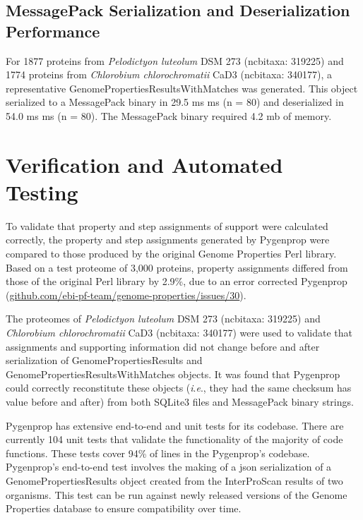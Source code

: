 \subsection{MessagePack Serialization and Deserialization Performance} 
\label{messagepack-performance}

For 1877 proteins from \textit{Pelodictyon luteolum} DSM 273 (\gls{ncbitaxa}:  
319225) and 1774 proteins from \textit{Chlorobium chlorochromatii} CaD3 
(\gls{ncbitaxa}: 340177), a representative GenomePropertiesResultsWithMatches 
was generated. This object serialized to a MessagePack binary in 29.5 ms  ms (\gls{n} = 80) and deserialized in 54.0 ms  ms (\gls{n} = 80). 
The MessagePack binary required 4.2 \gls{mb} of memory.

\section{Verification and Automated Testing}

To validate that property and step assignments of support were calculated 
correctly, the property and step assignments generated by Pygenprop were 
compared to those produced by the original Genome Properties Perl library. Based 
on a test proteome of 3,000 proteins, property assignments differed from those 
of the original Perl library by 2.9\%, due to an error corrected Pygenprop 
(\href{http://github.com/ebi-pf-team/genome-properties/issues/30}{github.com/ebi-pf-team/genome-properties/issues/30}).

The proteomes of \textit{Pelodictyon luteolum} DSM 273 (\gls{ncbitaxa}:  319225) 
and \textit{Chlorobium chlorochromatii} CaD3 (\gls{ncbitaxa}: 340177) were used 
to validate that assignments and supporting information did not change before 
and after serialization of GenomePropertiesResults and 
GenomePropertiesResultsWithMatches objects. It was found that Pygenprop could 
correctly reconstitute these objects (\textit{i}.\textit{e}., they had the same checksum has value 
before and after) from both SQLite3 files and MessagePack binary strings.

Pygenprop has extensive end-to-end and unit tests for its codebase. There are 
currently 104 unit tests that validate the functionality of the majority of code 
functions. These tests cover 94\% of lines in the Pygenprop's codebase. 
Pygenprop's end-to-end test involves the making of a \gls{json} serialization of 
a GenomePropertiesResults object created from the InterProScan results of two 
organisms. This test can be run against newly released versions of the Genome 
Properties database to ensure compatibility over time. 

